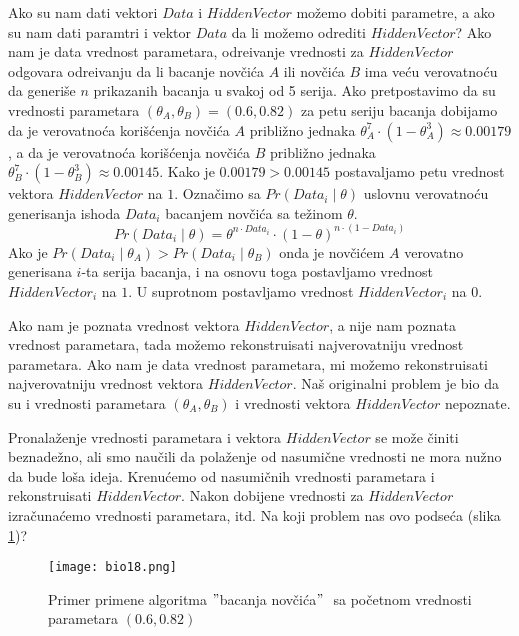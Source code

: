 Ako su nam dati vektori $Data$ i $HiddenVector$ možemo dobiti parametre, a ako su nam dati paramtri i vektor $Data$ da li možemo odrediti $HiddenVector$? Ako nam je data vrednost parametara, odre\dj ivanje vrednosti za $HiddenVector$ odgovara odre\dj ivanju da li bacanje novčića $A$ ili novčića $B$ ima veću verovatnoću da generiše $n$ prikazanih bacanja u svakoj od 5 serija. Ako pretpostavimo da su vrednosti parametara $(\theta_A,\theta_B) = (0.6,0.82)$ za petu seriju bacanja dobijamo da je verovatnoća korišćenja novčića $A$ približno jednaka $\theta_A^7\cdot(1-\theta_A^3) \approx 0.00179$, a da je verovatnoća korišćenja novčića $B$ približno jednaka $\theta_B^7\cdot(1-\theta_B^3) \approx 0.00145$. Kako je $0.00179 > 0.00145$ postavaljamo petu vrednost vektora $HiddenVector$ na $1$. Označimo sa $Pr(Data_i\mid \theta)$ uslovnu verovatnoću generisanja ishoda $Data_i$ bacanjem novčića sa težinom $\theta$.
$$
Pr(Data_i\mid \theta) = \theta^{n \cdot Data_i}\cdot(1-\theta)^{n \cdot (1-Data_i)}
$$
Ako je $Pr(Data_i\mid \theta_A) > Pr(Data_i\mid \theta_B)$ onda je novčićem $A$ verovatno generisana $i$-ta serija bacanja, i na osnovu toga postavljamo vrednost $HiddenVector_i$ na $1$. U suprotnom postavljamo vrednost $HiddenVector_i$ na $0$.

Ako nam je poznata vrednost vektora $HiddenVector$, a nije nam poznata vrednost parametara, tada možemo rekonstruisati najverovatniju vrednost parametara. Ako nam je data  vrednost parametara, mi možemo rekonstruisati najverovatniju vrednost vektora $HiddenVector$. Naš originalni problem je bio da su i vrednosti parametara $(\theta_A,\theta_B)$ i vrednosti vektora $HiddenVector$ nepoznate. 

Pronalaženje vrednosti parametara i vektora $HiddenVector$ se može činiti beznadežno, ali smo naučili da polaženje od nasumične vrednosti ne mora nužno da bude loša ideja. Krenućemo od nasumičnih vrednosti parametara i rekonstruisati $HiddenVector$. Nakon dobijene vrednosti za $HiddenVector$ izračunaćemo vrednosti parametara, itd. Na koji problem nas ovo podseća (slika \ref{slika 18})? 
\begin{figure}[h!]
    \centering
    \texttt{[image: bio18.png]}
    \caption{Primer primene algoritma$ $ $"$bacanja novčića$"$ $ $ sa početnom vrednosti parametara $(0.6, 0.82)$}
    \label{slika 18}
\end{figure}


